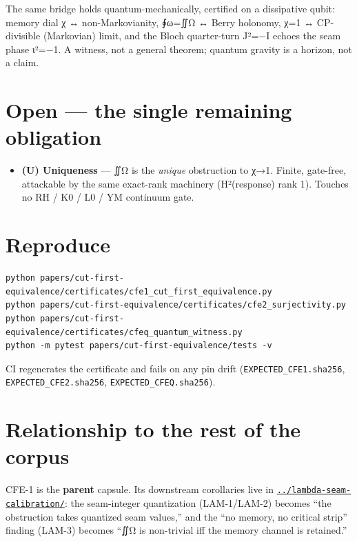The same bridge holds quantum-mechanically, certified on a dissipative
qubit: memory dial χ ↔ non-Markovianity, ∮ω=∬Ω ↔ Berry holonomy, χ=1 ↔
CP-divisible (Markovian) limit, and the Bloch quarter-turn J²=−I echoes
the seam phase ι²=−1. A witness, not a general theorem; quantum gravity
is a horizon, not a claim.

\hypertarget{open-the-single-remaining-obligation}{%
\section{Open --- the single remaining obligation}\label{open-the-single-remaining-obligation}}

\begin{itemize}
\tightlist
\item
  \textbf{(U) Uniqueness} --- ∬Ω is the \emph{unique} obstruction to χ→1. Finite,
  gate-free, attackable by the same exact-rank machinery (H²(response)
  rank 1). Touches no RH / K0 / L0 / YM continuum gate.
\end{itemize}

\hypertarget{reproduce}{%
\section{Reproduce}\label{reproduce}}

\begin{verbatim}
python papers/cut-first-equivalence/certificates/cfe1_cut_first_equivalence.py
python papers/cut-first-equivalence/certificates/cfe2_surjectivity.py
python papers/cut-first-equivalence/certificates/cfeq_quantum_witness.py
python -m pytest papers/cut-first-equivalence/tests -v
\end{verbatim}

CI regenerates the certificate and fails on any pin drift
(\texttt{EXPECTED\_CFE1.sha256}, \texttt{EXPECTED\_CFE2.sha256}, \texttt{EXPECTED\_CFEQ.sha256}).

\hypertarget{relationship-to-the-rest-of-the-corpus}{%
\section{Relationship to the rest of the corpus}\label{relationship-to-the-rest-of-the-corpus}}

CFE-1 is the \textbf{parent} capsule. Its downstream corollaries live in
\href{../lambda-seam-calibration/}{\texttt{../lambda-seam-calibration/}}: the
seam-integer quantization (LAM-1/LAM-2) becomes ``the obstruction takes
quantized seam values,'' and the ``no memory, no critical strip'' finding
(LAM-3) becomes ``∬Ω is non-trivial iff the memory channel is retained.''

